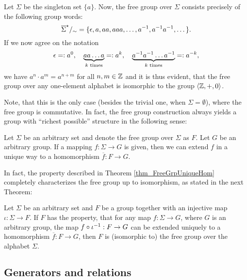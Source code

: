 \begin{example}
Let $\Sigma$ be the singleton set $\{a\}$. Now, the free group over $\Sigma$ consists precisely of the following group words:
\begin{equation*}
{\overline{\Sigma}}^{\star}/_{\sim} = \{\epsilon, a, aa, aaa, \dots, {a}^{-1}, {a}^{-1}{a}^{-1},\dots\}.
\end{equation*}
If we now agree on the notation
\begin{equation*}
\epsilon =: a^0, \quad 
\underbrace{a a \dots a}_{k \text{ times}} =: a^k, \quad
\underbrace{{a}^{-1} {a}^{-1} \dots {a}^{-1}}_{k \text{ times}} =: a^{-k},
\end{equation*}
we have $a^n \cdot a^m = a^{n+m}$ for all $n,m \in \mathbb{Z}$ and it is thus evident, that the free group over any one-element alphabet is isomorphic to the group $\langle \mathbb{Z}, +, 0 \rangle$. 

Note, that this is the only case (besides the trivial one, when $\Sigma = \emptyset$), where the free group is commutative. In fact, the free group construction always yields a group with ``richest possible'' structure in the following sense:

\begin{theorem}
\label{thm_FreeGrpUniqueHom}
Let $\Sigma$ be an arbitrary set and denote the free group over $\Sigma$ as $F$. Let $G$ be an arbitrary group. If a mapping $f : \Sigma \to G$ is given, then we can extend $f$ in a unique way to a homomorphism $\overline{f} : F \to G$.
\end{theorem}

In fact, the property described in Theorem \ref{thm_FreeGrpUniqueHom} completely characterizes the free group up to isomorphism, as stated in the next Theorem:

\begin{theorem}
\label{thm_FreeGrpUnivMapProp}
Let $\Sigma$ be an arbitrary set and $F$ be a group together with an injective map $\iota : \Sigma \to F$. If $F$ has the property, that for any map $f : \Sigma \to G$, where $G$ is an arbitrary group, the map $f \circ {\iota}^{-1}: F \to G$ can be extended uniquely to a homomorphism $\overline{f}: F \to G$, then $F$ is (isomorphic to) the free group over the alphabet $\Sigma$.
\end{theorem}

\end{example}

\subsection{Generators and relations}

